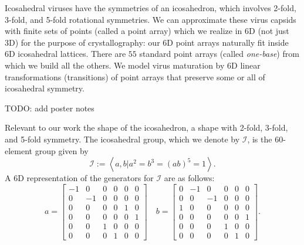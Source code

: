 \documentclass[a4paper,10pt]{article}
\theoremstyle{plain}
\theoremstyle{definition}
\theoremstyle{remark}
\newcommand{\generatedby}[1]{\left\langle#1\right\rangle}
\begin{document}
Icosahedral viruses have the symmetries of an icosahedron, which involves 2-fold, 3-fold, and 5-fold rotational symmetries.
We can approximate these virus capsids with finite sets of points (called a point array) which we realize in 6D (not just 3D) for the purpose of crystallography: our 6D point arrays naturally fit inside 6D icosahedral lattices. 
There are \(55\) standard point arrays (called \emph{one-base}) from which we build all the others.
We model virus maturation by 6D linear transformations (transitions) of point arrays that preserve some or all of icosahedral symmetry.

{\color{red} TODO: add poster notes}



Relevant to our work the shape of the icosahedron, a shape with 2-fold, 3-fold, and 5-fold symmetry.
The icosahedral group, which we denote by \(\mathcal{I}\), is the 60-element group given by \[\mathcal{I} := \generatedby{a, b | a^2 = b^3 = (ab)^5 = 1}.\]
A 6D representation of the generators for \(\mathcal{I}\) are as follows:
\[a = \begin{bmatrix}
    -1 & 0  & 0 & 0 & 0 & 0 \\
    0  & -1 & 0 & 0 & 0 & 0 \\
    0  & 0  & 0 & 0 & 1 & 0 \\
    0  & 0  & 0 & 0 & 0 & 1 \\
    0  & 0  & 1 & 0 & 0 & 0 \\
    0  & 0  & 0 & 1 & 0 & 0
\end{bmatrix} \quad b = \begin{bmatrix}
    0 & -1 & 0  & 0 & 0 & 0 \\
    0 & 0  & -1 & 0 & 0 & 0 \\
    1 & 0  & 0  & 0 & 0 & 0 \\
    0 & 0  & 0  & 0 & 0 & 1 \\
    0 & 0  & 0  & 1 & 0 & 0 \\
    0 & 0  & 0  & 0 & 1 & 0
\end{bmatrix}.\]
\end{document}
